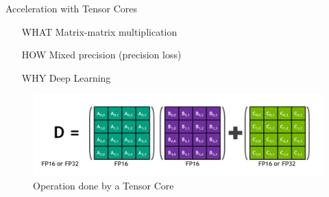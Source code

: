 \begin{frame}{Acceleration with Tensor Cores}
	\begin{center}
		\begin{minipage}{0.5\textwidth}
			\begin{itemize}
				\item[WHAT] Matrix-matrix multiplication
				\item[HOW] Mixed precision (precision loss)
				\item[WHY] Deep Learning
			\end{itemize}
		\end{minipage}
		
		\begin{figure}
			\includegraphics[width=\textwidth]{tensor_core_op}
			\caption{Operation done by a Tensor Core}
		\end{figure}
	\end{center}
\end{frame}
